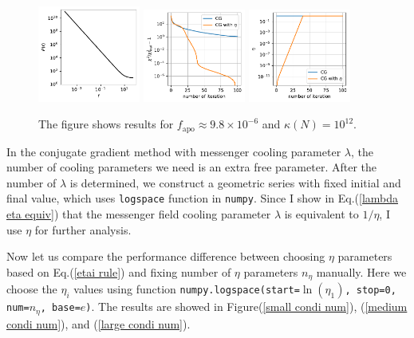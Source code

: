\documentclass[twocolumn,linenumbers]{aastex631}
\begin{document}
\begin{figure}[htb!]
\centering
\includegraphics[width=0.3\textwidth]{0.1/large_condition_num/P_f.pdf}
\includegraphics[width=0.3\textwidth]{0.1/large_condition_num/chi2_CG.pdf}
\includegraphics[width=0.3\textwidth]{0.1/large_condition_num/eta_CG.pdf}
\caption{The figure shows results for $f_{\text{apo}}\approx 9.8\times10^{-6}$ 
    and $\kappa(N) = 10^{12}$.
}
\label{large condi num CG}
\end{figure}

In the conjugate gradient method with messenger cooling parameter $\lambda$, 
the number of cooling parameters we need is an extra free parameter.
After the number of $\lambda$ is determined, we construct a geometric series
with fixed initial and final value, which uses \texttt{logspace}
function in \texttt{numpy}.
Since I  show in Eq.(\ref{lambda eta equiv}) that the messenger field
cooling parameter $\lambda$ is equivalent to $1/\eta$, I use $\eta$ for further analysis.

Now let us compare the performance difference between choosing $\eta$
parameters based on Eq.(\ref{etai rule})
and fixing number of $\eta$ parameters $n_{\eta}$ manually.
Here we choose the $\eta_i$ values using function
\texttt{numpy.logspace(start=$\ln(\eta_1)$, stop=0, num=$n_{\eta}$, base=$e$)}.
The results are showed in Figure(\ref{small condi num}),
(\ref{medium condi num}), and (\ref{large condi num}).
\end{document}
